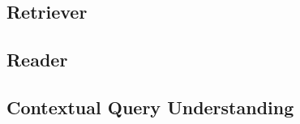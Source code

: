 









\subsection{Retriever}
\label{subsec:retriever}

\subsection{Reader}
\label{subsec:reader}

\subsection{Contextual Query Understanding}
\label{subsec:cqu}



